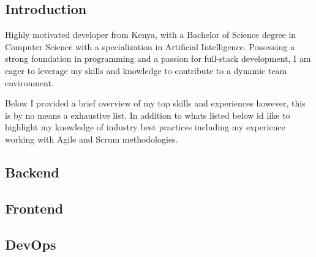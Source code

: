 \documentclass{modernsimplecv}
\newlength{\rightcolwidth}
\begin{document}
\begin{paracol}{2}
{}
\switchcolumn

\section{Introduction} 
{\small
Highly motivated developer from Kenya, with a Bachelor of Science degree in Computer Science with a specialization in Artificial Intelligence. Possessing a strong foundation in programming and a passion for full-stack development, I am eager to leverage my skills and knowledge to contribute to a dynamic team environment.

\hfill \break
Below I provided  a brief overview of my top skills and experiences however, this is by no means a exhaustive list. In addition to whats listed below id like to highlight my knowledge of industry best practices including my experience working with Agile and Scrum methodologies.}
\bigskip


\subsection*{Backend}

\begin{skillsection}{\rightcolwidth}
\end{skillsection}

\subsection*{Frontend}

\begin{skillsection}{\rightcolwidth}
\end{skillsection}

\subsection*{DevOps}

\begin{skillsection}{\rightcolwidth}
\end{skillsection}


\end{paracol}
\end{document}
